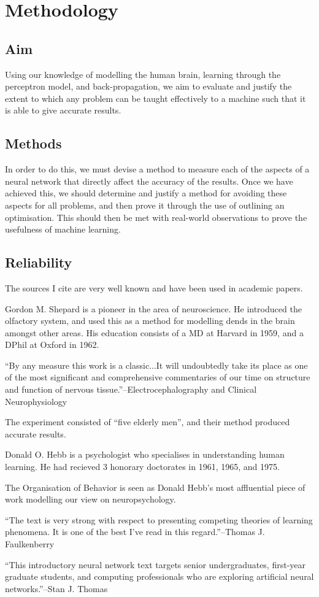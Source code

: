 \section{Methodology}

\subsection{Aim}

Using our knowledge of \gls{model}ling the human brain, learning through the \gls{perceptron} \gls{model}, and back-propagation, we aim to evaluate and justify the extent to which any problem can be taught effectively to a machine such that it is able to give accurate results.

\subsection{Methods}

In order to do this, we must devise a method to measure each of the aspects of a neural network that directly affect the accuracy of the results. Once we have achieved this, we should determine and justify a method for avoiding these aspects for all problems, and then prove it through the use of outlining an optimisation. This should then be met with real-world observations to prove the usefulness of machine learning.

\subsection{Reliability}

The sources I cite are very well known and have been used in academic papers.

\cite{brain} Gordon M. Shepard is a pioneer in the area of neuroscience. He introduced the olfactory system, and used this as a method for \gls{model}ling \gls{dend}s in the brain amongst other areas. His education consists of a MD at Harvard in 1959, and a DPhil at Oxford in 1962. 

“By any measure this work is a classic...It will undoubtedly take its place as one of the most significant and comprehensive commentaries of our time on structure and function of nervous tissue.”--Electrocephalography and Clinical Neurophysiology

\cite{neuron} The experiment consisted of “five elderly men”, and their method produced accurate results.

\cite{hebb} Donald O. Hebb is a psychologist who specialises in understanding human learning. He had recieved 3 honorary doctorates in 1961, 1965, and 1975.

The Organisation of Behavior is seen as Donald Hebb's most affluential piece of work \gls{model}ling our view on neuropsychology.

\cite{learn} “The text is very strong with respect to presenting competing theories of learning phenomena. It is one of the best I’ve read in this regard.”--Thomas J. Faulkenberry

\cite{nnd} “This introductory neural network text targets senior undergraduates, first-year graduate students, and computing professionals who are exploring artificial neural networks.”--Stan J. Thomas
